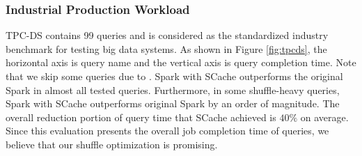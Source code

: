 
\subsubsection{Industrial Production Workload}
TPC-DS contains 99 queries and is considered as the standardized industry benchmark for testing big data systems. 
As shown in Figure \ref{fig:tpcds}, the horizontal axis is query name and the vertical axis is query completion time. 
Note that we skip some queries due to . 
Spark with SCache outperforms the original Spark in almost all tested queries. 
Furthermore, in some shuffle-heavy queries, Spark with SCache outperforms original Spark by an order of magnitude. 
The overall reduction portion of query time that SCache achieved is $40\%$ on average. 
Since this evaluation presents the overall job completion time of queries, we believe that our shuffle optimization is promising.


